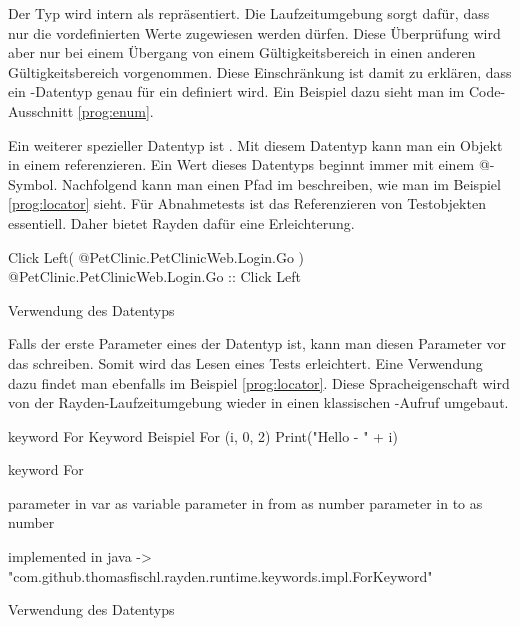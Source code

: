 \SuperPar
Der Typ  wird intern als  repräsentiert. Die Laufzeitumgebung sorgt dafür, dass nur die vordefinierten Werte zugewiesen werden dürfen. Diese Überprüfung wird aber nur bei einem Übergang von einem Gültigkeitsbereich in einen anderen Gültigkeitsbereich vorgenommen. Diese Einschränkung ist damit zu erklären, dass ein -Datentyp genau für ein  definiert wird. Ein Beispiel dazu sieht man im Code-Ausschnitt \ref{prog:enum}.  

\SuperPar
Ein weiterer spezieller Datentyp ist . Mit diesem Datentyp kann man ein Objekt in einem  referenzieren. Ein Wert dieses Datentyps beginnt immer mit einem @-Symbol. Nachfolgend kann man einen Pfad im  beschreiben, wie man im Beispiel \ref{prog:locator} sieht. Für Abnahmetests ist das Referenzieren von Testobjekten essentiell. Daher bietet Rayden dafür eine Erleichterung. 

\begin{program}
\begin{JavaCode}
Click Left( @PetClinic.PetClinicWeb.Login.Go )
@PetClinic.PetClinicWeb.Login.Go :: Click Left
\end{JavaCode}
\caption{Verwendung des Datentyps }
\label{prog:locator}
\end{program}

\SuperPar
Falls der erste Parameter eines  der Datentyp  ist, kann man diesen Parameter vor das  schreiben. Somit wird das Lesen eines Tests erleichtert. Eine Verwendung dazu findet man ebenfalls im Beispiel \ref{prog:locator}. Diese Spracheigenschaft wird von der Rayden-Laufzeitumgebung wieder in einen klassischen -Aufruf umgebaut.

\begin{program}
\begin{JavaCode}
keyword For Keyword Beispiel {
	For (i, 0, 2) {
		Print("Hello - " + i)
	}
}

keyword For { 
	parameter in var as variable
	parameter in from as number
	parameter in to as number

	implemented in java -> "com.github.thomasfischl.rayden.runtime.keywords.impl.ForKeyword"
}
\end{JavaCode}
\caption{Verwendung des Datentyps }
\label{prog:variable}
\end{program}

